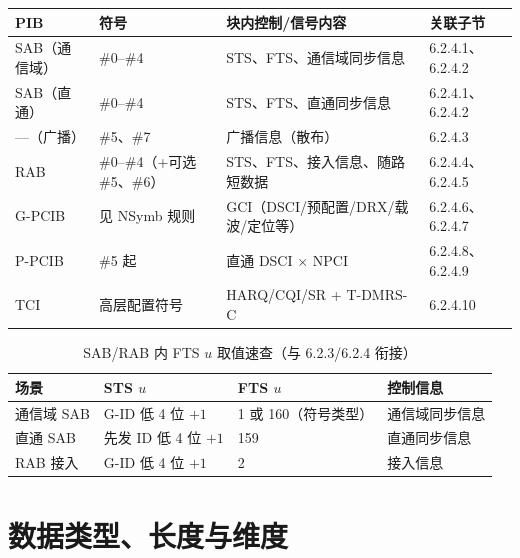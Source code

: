 \documentclass[11pt,a4paper]{ctexart}
\begin{document}
\begin{table}[h]
\centering
\footnotesize
\begin{tabular}{L{2cm}L{1.8cm}L{5.5cm}L{3.7cm}}
\toprule
\textbf{PIB} & \textbf{符号} & \textbf{块内控制/信号内容} & \textbf{关联子节} \\
\midrule
SAB（通信域） & \#0--\#4 & STS、FTS、通信域同步信息 & 6.2.4.1、6.2.4.2 \\
SAB（直通） & \#0--\#4 & STS、FTS、直通同步信息 & 6.2.4.1、6.2.4.2 \\
---（广播） & \#5、\#7 & 广播信息（散布） & 6.2.4.3 \\
RAB & \#0--\#4（+可选 \#5、\#6） & STS、FTS、接入信息、随路短数据 & 6.2.4.4、6.2.4.5 \\
G-PCIB & 见 NSymb 规则 & GCI（DSCI/预配置/DRX/载波/定位等） & 6.2.4.6、6.2.4.7 \\
P-PCIB & \#5 起 & 直通 DSCI $\times$ NPCI & 6.2.4.8、6.2.4.9 \\
TCI & 高层配置符号 & HARQ/CQI/SR + T-DMRS-C & 6.2.4.10 \\
\bottomrule
\end{tabular}
\end{table}

\begin{table}[h]
\centering
\small
\caption{SAB/RAB 内 FTS $u$ 取值速查（与 6.2.3/6.2.4 衔接）}
\begin{tabular}{llll}
\toprule
\textbf{场景} & \textbf{STS $u$} & \textbf{FTS $u$} & \textbf{控制信息} \\
\midrule
通信域 SAB & G-ID 低 4 位 $+1$ & 1 或 160（符号类型） & 通信域同步信息 \\
直通 SAB & 先发 ID 低 4 位 $+1$ & 159 & 直通同步信息 \\
RAB 接入 & G-ID 低 4 位 $+1$ & 2 & 接入信息 \\
\bottomrule
\end{tabular}
\end{table}

\section{数据类型、长度与维度}
\end{document}

